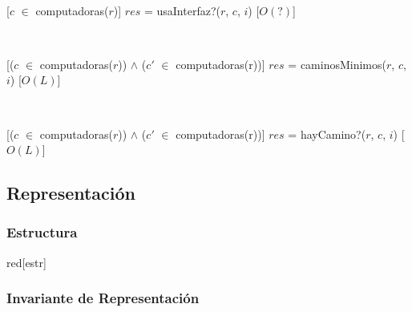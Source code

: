   ~

  [$c$ $\in$ computadoras($r$)]
  {$res$ = usaInterfaz?($r$, $c$, $i$)}
  [$O(?)$]

  ~

  [($c$ $\in$ computadoras($r$)) $\land$ ($c'$ $\in$ computadoras(r))]
  {$res$ = caminosMinimos($r$, $c$, $i$)}
  [$O(L)$]

  ~

  [($c$ $\in$ computadoras($r$)) $\land$ ($c'$ $\in$ computadoras(r))]
  {$res$ = hayCamino?($r$, $c$, $i$)}
  [$O(L)$]


\subsection{Representación}

  \subsubsection{Estructura}

    \begin{Estructura}{red}[estr]

      \begin{Tupla}[estr]
      \end{Tupla}

      \begin{Tupla}[nodoRed]
      \end{Tupla}

    \end{Estructura}

\subsubsection{Invariante de Representación}




